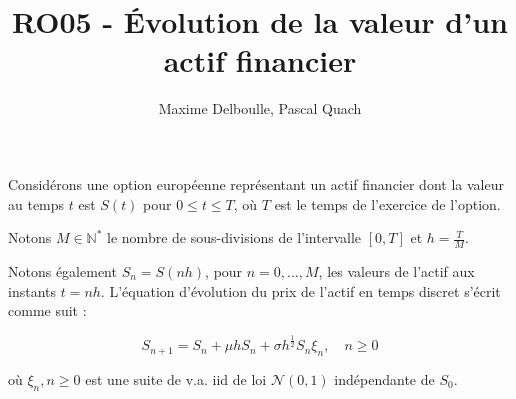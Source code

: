 \documentclass[answers, 10pt]{exam}
\begin{document}
\title{RO05 - \'Evolution de la valeur d'un actif financier}
\author{Maxime Delboulle, Pascal Quach}
\maketitle

Considérons une option européenne représentant un actif financier dont la
valeur au temps $t$ est $S(t)$ pour $0 \leq t \leq T$, où $T$ est le temps de
l’exercice de l’option. 

Notons $M\in \mathbb{N}^*$ le nombre de sous-divisions de l’intervalle $[0, T]$
et $h=\frac{T}{M}$.  

Notons également $S_n = S(nh)$, pour $n=0, \dots, M$, les valeurs de l’actif
aux instants $t= nh$.  L’équation d’évolution du prix de l’actif en temps
discret s’écrit comme suit :

\begin{equation}\label{eq:actif-financier}
	S_{n+1} = S_n + \mu h S_n + \sigma h^{ \frac{1}{2} } S_n \xi_n,\quad n \geq 0 
\end{equation}

où $\xi_n, n\geq 0$ est une suite de v.a. iid de loi $\mathcal{N}(0, 1)$
indépendante de $S_0$.
\end{document}
